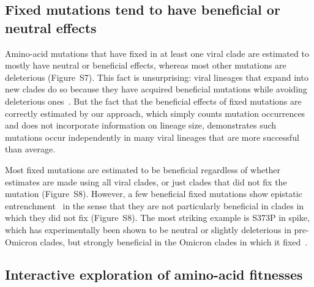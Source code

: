 \documentclass[9pt,twocolumn,twoside]{gsajnl_modified}
\begin{document}
\subsection*{Fixed mutations tend to have beneficial or neutral effects}
Amino-acid mutations that have fixed in at least one viral clade are estimated to mostly have neutral or beneficial effects, whereas most other mutations are deleterious (Figure~S7).
This fact is unsurprising: viral lineages that expand into new clades do so because they have acquired beneficial mutations while avoiding deleterious ones~\citep{luksza2014predictive, koelle2015effects, huddleston2020integrating}.
But the fact that the beneficial effects of fixed mutations are correctly estimated by our approach, which simply counts mutation occurrences and does not incorporate information on lineage size, demonstrates such mutations occur independently in many viral lineages that are more successful than average.

Most fixed mutations are estimated to be beneficial regardless of whether estimates are made using all viral clades, or just clades that did not fix the mutation (Figure~S8).
However, a few beneficial fixed mutations show epistatic entrenchment~\citep{shah2015contingency, starr2018pervasive} in the sense that they are not particularly beneficial in clades in which they did not fix (Figure~S8).
The most striking example is S373P in spike, which has experimentally been shown to be neutral or slightly deleterious in pre-Omicron clades, but strongly beneficial in the Omicron clades in which it fixed~\citep{starr2022deep, moulana2022compensatory}.

\subsection*{Interactive exploration of amino-acid fitnesses}
\end{document}
